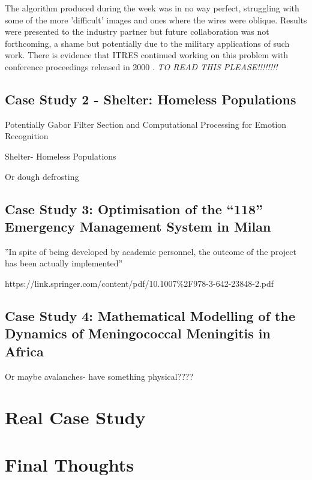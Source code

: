 \documentclass[11pt]{article} %
\begin{document}
	The algorithm produced during the week was in no way perfect, struggling with some of the more 'difficult' images and ones where the wires were oblique. Results were presented to the industry partner but future collaboration was not forthcoming, a shame but potentially due to the military applications of such work. There is evidence that ITRES continued working on this problem with conference proceedings released in 2000 \cite{Babey}. \emph{TO READ THIS PLEASE!!!!!!!!}
	

	
	
	\subsection{Case Study 2 - Shelter: Homeless Populations}
	
	Potentially Gabor Filter Section and Computational Processing for Emotion Recognition 
	
	Shelter- Homeless Populations 
	
	
	 Or dough defrosting 
	
	
	\subsection{Case Study 3: Optimisation of the “118” Emergency Management System in Milan  }
	
	''In spite of being developed by academic personnel, the outcome of the project has been actually implemented''
	
	https://link.springer.com/content/pdf/10.1007\%2F978-3-642-23848-2.pdf
	
	
	\subsection{Case Study 4: Mathematical Modelling of the Dynamics of Meningococcal Meningitis in Africa  }
	Or maybe avalanches- have something physical????
	
	\section{Real Case Study}
	
	\section{Final Thoughts} 

	
	
	
\end{document}
